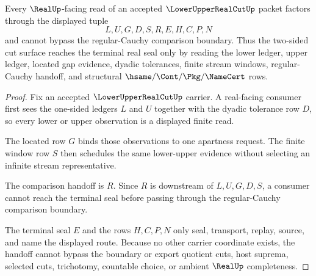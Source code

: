 \begin{theorem}
\label{thm:lower-upper-real-cut-cauchy-handoff}
Every $\RealUp$-facing read of an accepted $\LowerUpperRealCutUp$ packet factors through the displayed tuple
$$
L,U,G,D,S,R,E,H,C,P,N
$$
and cannot bypass the regular-Cauchy comparison boundary. Thus the two-sided cut surface reaches the terminal real seal only by reading the lower ledger, upper ledger, located gap evidence, dyadic tolerances, finite stream windows, regular-Cauchy handoff, and structural $\hsame/\Cont/\Pkg/\NameCert$ rows.
\end{theorem}
\begin{proof}
Fix an accepted $\LowerUpperRealCutUp$ carrier. A real-facing consumer first sees the one-sided ledgers $L$ and $U$ together with the dyadic tolerance row $D$, so every lower or upper observation is a displayed finite read.

The located row $G$ binds those observations to one apartness request. The finite window row $S$ then schedules the same lower-upper evidence without selecting an infinite stream representative.

The comparison handoff is $R$. Since $R$ is downstream of $L,U,G,D,S$, a consumer cannot reach the terminal seal before passing through the regular-Cauchy comparison boundary.

The terminal seal $E$ and the rows $H,C,P,N$ only seal, transport, replay, source, and name the displayed route. Because no other carrier coordinate exists, the handoff cannot bypass the boundary or export quotient cuts, host suprema, selected cuts, trichotomy, countable choice, or ambient $\RealUp$ completeness.
\end{proof}


\begin{closurestatus}{\LowerUpperRealCutUp}
  \theoryclosure{\seedClosure}
  \formalstatus{\unformalizedV}
\end{closurestatus}
